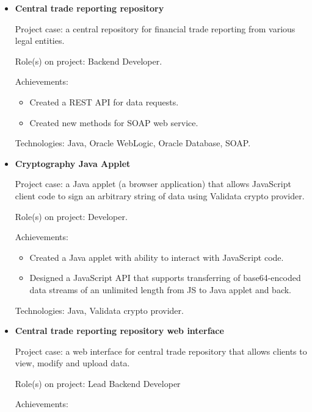 \documentclass{article}
\begin{document}
\begin{itemize}
{        Technologies: C\#, NET Framework, WPF, Validata crypto provider.
    }
    \item {
        \textbf{Central trade reporting repository}
        
        Project case: a central repository for financial trade reporting from various legal entities.
        
        Role(s) on project: Backend Developer.
        
        Achievements:
        
            \begin{itemize}
                \item Created a REST API for data requests.
                \item Created new methods for SOAP web service.
            \end{itemize}
        
        Technologies: Java, Oracle WebLogic, Oracle Database, SOAP.
    }
    \item {
        \textbf{Cryptography Java Applet}
        
        Project case: a Java applet (a browser application) that allows JavaScript client code to sign an arbitrary string of data using Validata crypto provider.
        
        Role(s) on project: Developer.
        
        Achievements:
        
            \begin{itemize}
                \item Created a Java applet with ability to interact with JavaScript code.
                \item Designed a JavaScript API that supports transferring of base64-encoded data streams of an unlimited length from JS to Java applet and back.
            \end{itemize}
        
        Technologies: Java, Validata crypto provider.
    }
    \item {
        \textbf{Central trade reporting repository web interface}
        
        Project case: a web interface for central trade repository that allows clients to view, modify and upload data.
        
        Role(s) on project: Lead Backend Developer
        
        Achievements:
        
}
\end{itemize}
\end{document}
